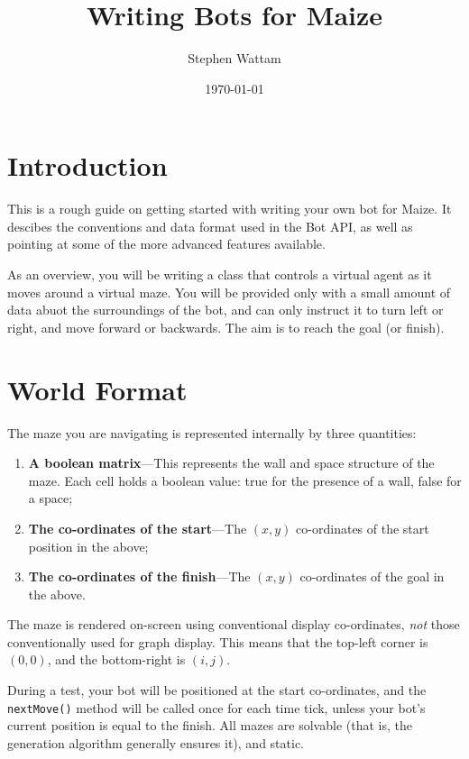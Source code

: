 \documentclass[11pt]{article}
\begin{document}
\title{Writing Bots for Maize}
\author{Stephen Wattam}
\date{\today}
\maketitle

\tableofcontents{}
\pagebreak


\section{Introduction}
This is a rough guide on getting started with writing your own bot for Maize.  It descibes the conventions and data format used in the Bot API, as well as pointing at some of the more advanced features available.

As an overview, you will be writing a class that controls a virtual agent as it moves around a virtual maze.  You will be provided only with a small amount of data abuot the surroundings of the bot, and can only instruct it to turn left or right, and move forward or backwards.  The aim is to reach the goal (or finish).


\section{World Format}
The maze you are navigating is represented internally by three quantities:
\begin{enumerate}
\item \textbf{A boolean matrix}---This represents the wall and space structure of the maze.  Each cell holds a boolean value: true for the presence of a wall, false for a space;
\item \textbf{The co-ordinates of the start}---The $(x,y)$ co-ordinates of the start position in the above;
\item \textbf{The co-ordinates of the finish}---The $(x,y)$ co-ordinates of the goal in the above.
\end{enumerate}
The maze is rendered on-screen using conventional display co-ordinates, \textit{not} those conventionally used for graph display.  This means that the top-left corner is $(0,0)$, and the bottom-right is $(i,j)$.


During a test, your bot will be positioned at the start co-ordinates, and the \texttt{nextMove()} method will be called once for each time tick, unless your bot's current position is equal to the finish.  All mazes are solvable (that is, the generation algorithm generally ensures it), and static.
\end{document}

